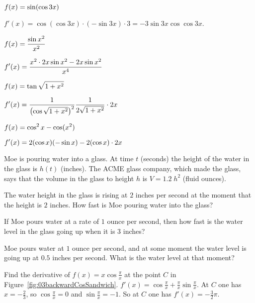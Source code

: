 \begin{multicols}{2}
\subprob $\displaystyle f(x)   = \sin (\cos 3x) $




\answer 
$f'(x) = \cos(\cos 3x)\cdot (-\sin 3x)\cdot 3 = -3\sin 3x \cos\cos
3x$.
\endanswer




\subprob $\displaystyle f(x)   = \frac{\sin x^2}{x^2} $




\answer 
$\displaystyle f'(x) = \frac{x^2\cdot 2x\sin x^2 - 2x\sin x^2}{x^4}$
\endanswer




\subprob $\displaystyle f(x)   = \tan\sqrt{1+x^2}$




\answer 
$\displaystyle f'(x) = \frac1{\bigl(\cos \sqrt{1+x^2}\bigr)^2}
\frac1{2\sqrt{1+x^2}}\cdot 2x$
\endanswer




\subprob $\displaystyle f(x)   = \cos^2x - \cos (x^2)$




\answer 
$\displaystyle f'(x) = 2(\cos x)(-\sin x)-2(\cos x) \cdot 2x$
\endanswer








\medskip




\problem \groupproblem Moe is pouring water into a glass. 
At time $t$ (seconds) the height of
the water in the glass is $h(t)$ (inches).  The \textsc{ACME} glass
company, which made the glass, says that the volume in the glass to
height $h$ is $V = 1.2\;h^2$ (fluid ounces).




\subprob  The water height in the glass is rising at $2$ inches per
second at the moment that the height is $2$ inches.  How fast is Moe
pouring water into the glass?




\subprob  If Moe pours water at a rate of $1$ ounce per second, then
how fast is the water level in the glass going up when it is $3$ inches?




\subprob  Moe pours water at $1$ ounce per second, and at some moment
the water level is going up at $0.5$ inches per second.  What is the water
level at that moment?








\problem Find the derivative of $f(x) = x\cos\frac\pi x$ at the point $C$ in 
Figure~\ref{fig:03backwardCosSandwich}.
\answer 
$f'(x) = \cos\frac\pi x + \frac\pi x \sin\frac\pi x$.
At $C$ one has $x=-\frac23$, so $\cos\frac\pi x = 0$ and
$\sin\frac\pi x = -1$.  So at $C$ one has $f'(x) = -\frac32\pi$.
\endanswer













\end{multicols}
